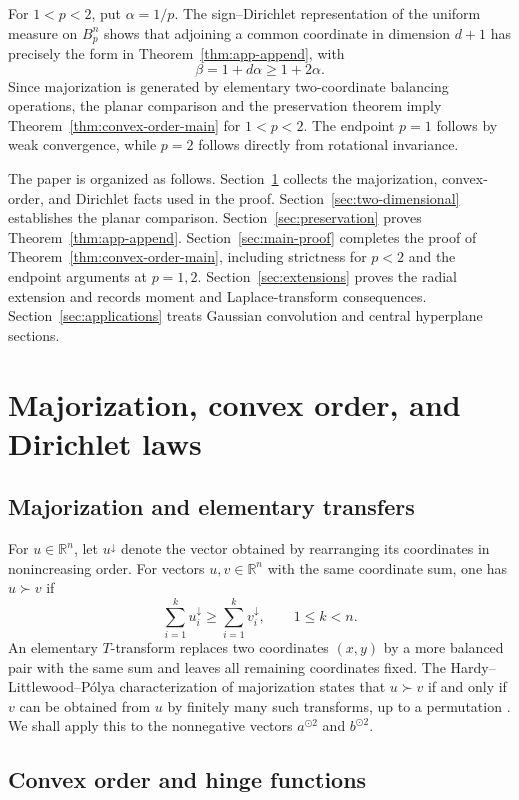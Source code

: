 \documentclass[pdflatex,sn-mathphys-num]{sn-jnl}
\numberwithin{equation}{section}
\theoremstyle{thmstyleone}
\theoremstyle{thmstylethree}
\newcommand{\R}{\mathbb{R}}
\newcommand{\1}{\mathbf{1}}
\newcommand{\sqvec}[1]{#1^{\odot 2}}
\begin{document}
For $1<p<2$, put $\alpha=1/p$. The sign--Dirichlet representation of
the uniform measure on $B_p^n$ shows that adjoining a common coordinate
in dimension $d+1$ has precisely the form in
Theorem~\ref{thm:app-append}, with
\[
 \beta=1+d\alpha\ge1+2\alpha.
\]
Since majorization is generated by elementary two-coordinate
balancing operations, the planar comparison and the preservation
theorem imply Theorem~\ref{thm:convex-order-main} for $1<p<2$. The
endpoint $p=1$ follows by weak convergence, while $p=2$ follows directly
from rotational invariance.

The paper is organized as follows. Section~\ref{sec:preliminaries}
collects the majorization, convex-order, and Dirichlet facts used in the
proof. Section~\ref{sec:two-dimensional} establishes the planar
comparison. Section~\ref{sec:preservation} proves
Theorem~\ref{thm:app-append}. Section~\ref{sec:main-proof} completes the proof of
Theorem~\ref{thm:convex-order-main}, including strictness for $p<2$
and the endpoint arguments at $p=1,2$. Section~\ref{sec:extensions} proves the radial
extension and records moment and Laplace-transform consequences.
Section~\ref{sec:applications} treats Gaussian convolution and central
hyperplane sections.

\section{Majorization, convex order, and Dirichlet laws}\label{sec:preliminaries}

\subsection{Majorization and elementary transfers}

For $u\in\R^n$, let $u^\downarrow$ denote the vector obtained by
rearranging its coordinates in nonincreasing order. For vectors
$u,v\in\R^n$ with the same coordinate sum, one has $u\succ v$ if
\[
 \sum_{i=1}^k u_i^\downarrow
 \ge
 \sum_{i=1}^k v_i^\downarrow,
 \qquad 1\le k<n.
\]
An elementary $T$-transform replaces two coordinates $(x,y)$ by a more
balanced pair with the same sum and leaves all remaining coordinates
fixed. The Hardy--Littlewood--P\'olya characterization of majorization
states that $u\succ v$ if and only if $v$ can be obtained from $u$ by
finitely many such transforms, up to a permutation
\cite[Ch.~2]{MarshallOlkinArnold}. We shall apply this to the
nonnegative vectors $\sqvec a$ and $\sqvec b$.

\subsection{Convex order and hinge functions}
\end{document}
